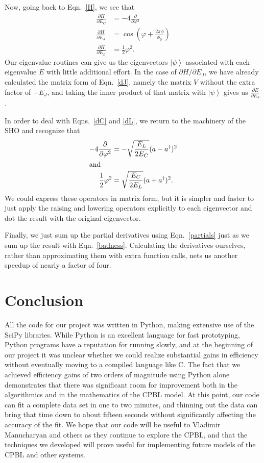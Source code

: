 \documentclass[twocolumn]{revtex4}
\newcommand{\ket}[1]{\left| #1 \right>}
\begin{document}
Now, going back to Eqn.~\ref{H}, we see that
\begin{align}
  \label{dC}
  \frac{\partial H}{\partial E_C} &= -4\frac{\partial}{\partial
    \varphi^2}\\
  \label{dJ}
  \frac{\partial H}{\partial E_J} &= \cos(\varphi +
  \frac{2\pi\phi}{\phi_0})\\
  \label{dL}
  \frac{\partial H}{\partial E_L} &= \frac{1}{2}\varphi^2.
\end{align}
Our eigenvalue routines can give us the eigenvectors $\ket{\psi}$
associated with each eigenvalue $E$ with little additional effort. In
the case of $\partial H/\partial E_J$, we have already calculated the
matrix form of Eqn.~\ref{dJ}, namely the matrix $V$ without the extra
factor of $-E_J$, and taking the inner product of that matrix with
$\ket{\psi}$ gives us $\frac{\partial E}{\partial E_J}$.

In order to deal with Eqns.~\ref{dC} and \ref{dL}, we return to the
machinery of the SHO and recognize that
\begin{align}
  -4\frac{\partial}{\partial \varphi^2} &= -\sqrt{\frac{E_L}{2E_C}}
  (a-a^\dagger)^2\\
  \intertext{and}
  \frac{1}{2}\varphi^2 &= \sqrt{\frac{E_C}{2E_L}} (a+a^\dagger)^2.
\end{align}
We could express these operators in matrix form, but it is simpler and
faster to just apply the raising and lowering operators explicitly to
each eigenvector and dot the result with the original eigenvector.

Finally, we just sum up the partial derivatives using
Eqn.~\ref{partials} just as we sum up the result with
Eqn.~\ref{badness}. Calculating the derivatives ourselves, rather than
approximating them with extra function calls, nets us another speedup
of nearly a factor of four.

\section{Conclusion}
All the code for our project was written in Python, making extensive
use of the SciPy libraries. While Python is an excellent language for
fast prototyping, Python programs have a reputation for running
slowly, and at the beginning of our project it was unclear whether we
could realize substantial gains in efficiency without eventually
moving to a compiled language like C. The fact that we achieved
efficiency gains of two orders of magnitude using Python alone
demonstrates that there was significant room for improvement both in
the algorithmics and in the mathematics of the CPBL model. At this
point, our code can fit a complete data set in one to two minutes, and
thinning out the data can bring that time down to about fifteen
seconds without significantly affecting the accuracy of the fit. We
hope that our code will be useful to Vladimir Manucharyan and others as
they continue to explore the CPBL, and that the techniques we
developed will prove useful for implementing future models of the CPBL
and other systems.
\end{document}
